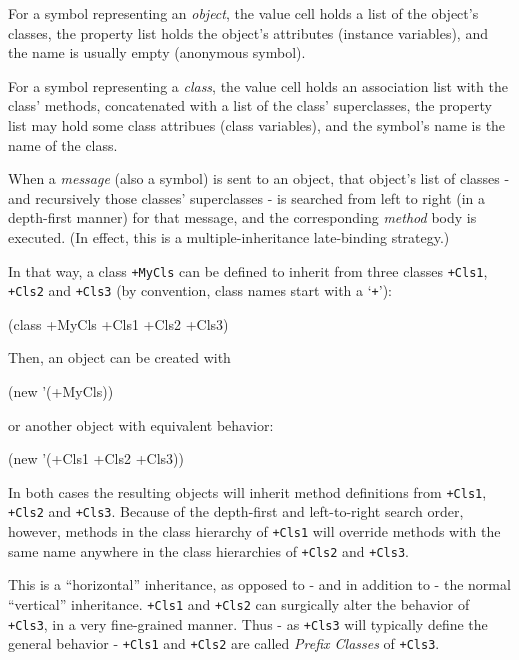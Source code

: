 For a symbol representing an \emph{object}, the value cell holds a list of
the object's classes, the property list holds the object's attributes
(instance variables), and the name is usually empty (anonymous symbol).

For a symbol representing a \emph{class}, the value cell holds an association
list with the class' methods, concatenated with a list of the class'
superclasses, the property list may hold some class attribues (class
variables), and the symbol's name is the name of the class.

When a \emph{message} (also a symbol) is sent to an object, that object's
list of classes - and recursively those classes' superclasses - is
searched from left to right (in a depth-first manner) for that message,
and the corresponding \emph{method} body is executed. (In effect, this is a
multiple-inheritance late-binding strategy.)

In that way, a class \texttt{+MyCls} can be defined to inherit from
three classes \texttt{+Cls1}, \texttt{+Cls2} and \texttt{+Cls3} (by
convention, class names start with a `\texttt{+}'):


\begin{wideverbatim}
(class +MyCls +Cls1 +Cls2 +Cls3)
\end{wideverbatim}

Then, an object can be created with


\begin{wideverbatim}
(new '(+MyCls))
\end{wideverbatim}

or another object with equivalent behavior:


\begin{wideverbatim}
(new '(+Cls1 +Cls2 +Cls3))
\end{wideverbatim}

In both cases the resulting objects will inherit method definitions from
\texttt{+Cls1}, \texttt{+Cls2} and \texttt{+Cls3}. Because of the depth-first and
left-to-right search order, however, methods in the class hierarchy of
\texttt{+Cls1} will override methods with the same name anywhere in the class
hierarchies of \texttt{+Cls2} and \texttt{+Cls3}.

This is a ``horizontal'' inheritance, as opposed to - and in addition to -
the normal ``vertical'' inheritance. \texttt{+Cls1} and \texttt{+Cls2} can surgically
alter the behavior of \texttt{+Cls3}, in a very fine-grained manner. Thus - as
\texttt{+Cls3} will typically define the general behavior - \texttt{+Cls1} and \texttt{+Cls2}
are called \emph{Prefix Classes} of \texttt{+Cls3}.

